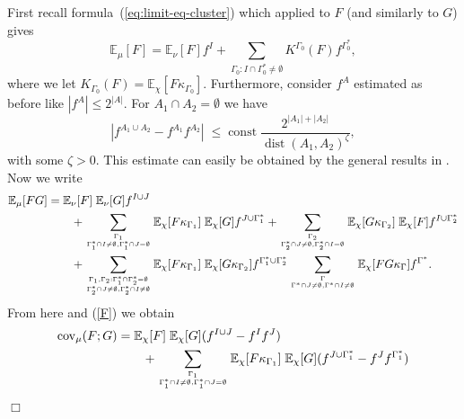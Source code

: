 \documentclass[a4paper,11pt]{article}
\newenvironment{proof}[1][Proof]{{\sc #1.} }{\hfill $\Box$}
\newcommand{\dist}{\mathop{\mathrm{dist}}\nolimits}
\newcommand {\Ga} {\ensuremath{\Gamma}}
\newcommand{\cov}{\mathop{\mathrm{cov}}\nolimits}
\begin{document}
\medskip
\begin{proof}
First recall formula~(\ref{eq:limit-eq-cluster}) which applied to $F$ 
(and similarly to $G$) gives
\begin{equation}
\mathbb{E}_\mu [F] = \mathbb{E}_\nu [F] f^{I} + 
\sum_{\Ga_0: I \cap \Ga_0^* \neq \emptyset} K^{\Ga_0}(F) f^{\Ga_0^*},
\label{F}
\end{equation}
where we let $K_{\Ga_0}(F) = \mathbb{E}_{\chi} [F \kappa_{\Ga_0}] $. 
Furthermore, consider $f^A$ estimated as before like $|f^A| \leq 
2^{|A|}$. For $A_1 \cap A_2 = \emptyset$ we have
\begin{equation}
|f^{A_1 \cup A_2} - f^{A_1} f^{A_2}| \; \leq \; \mbox{const} \; 
\frac{2^{|A_1| + |A_2|}}{\dist(A_1,A_2)^\zeta},
\label{cost}
\end{equation}
with some $\zeta > 0$. This estimate can easily be obtained by the 
general results in \cite{MM}. Now we  write
\begin{equation}
\begin{split}
\mathbb{E}_\mu [F G] 
& =  
\mathbb{E}_\nu [F] \; \mathbb{E}_\nu [G] f^{I \cup J} \\
& \qquad + 
\sum_{\Ga_1 \atop  \Ga^*_1 \cap I \neq \emptyset , \Ga^*_1 \cap J 
= \emptyset} \mathbb{E}_{\chi} [F \kappa_{\Ga_1}] \; 
\mathbb{E}_\chi [G]  f^{J \cup \Ga^*_1}
+ \sum_{\Ga_2 \atop  \Ga^*_2 \cap J \neq \emptyset , \Ga^*_2 \cap I 
= \emptyset} \mathbb{E}_{\chi} [G \kappa_{\Ga_2}] \; 
\mathbb{E}_\chi [F]  f^{I \cup \Ga^*_2}
\\
& \qquad + 
\sum_{\Ga_1,\Ga_2 : \Ga^*_1 \cap \Ga^*_2 = \emptyset \atop  \Ga^*_2 
\cap J \neq \emptyset , \Ga^*_2 \cap I \neq \emptyset}  
\mathbb{E}_\chi [F \kappa_{\Ga_1}] \; 
\mathbb{E}_{\chi} [G \kappa_{\Ga_2}]  f^{\Ga^*_1 \cup \Ga^*_2}
\sum_{\Ga \atop  \Ga^* \cap J \neq \emptyset , \Ga^* \cap I \neq 
\emptyset}  \mathbb{E}_\chi [F G \kappa_{\Ga}] f^{\Ga^*}.
\end{split}
\end{equation}
From here and (\ref{F}) we obtain
\begin{equation}
\begin{split}
\cov_\mu(F; G) 
& = 
\mathbb{E}_\chi [F] \; \mathbb{E}_\chi [G](f^{I\cup J}-f^{I}f^{J}) 
\\ & \qquad + 
\sum_{\Ga_1 \atop  \Ga^*_1 \cap I \neq \emptyset , \Ga^*_1 \cap J 
= \emptyset} \mathbb{E}_{\chi} [F \kappa_{\Ga_1}] \; 
\mathbb{E}_\chi [G]  (f^{J \cup \Ga^*_1}- f^{J} f^{\Ga^*_1})

\end{split}
\end{equation}
\end{proof}
\end{document}
